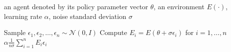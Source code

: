 \documentclass{article}
\newcommand{\jc}[1]{\comments{\textcolor{deepForestGreen}{[JC: #1]}}}
\newcommand{\rw}[1]{\comments{\textcolor{blue}{[Rui: #1]}}}
\newcommand{\comments}[1]{#1}
\begin{document}
\begin{algorithm}[htp]
\caption{ES\_STEP}
\label{alg:es_step}
\begin{algorithmic}[1]
    an agent denoted by its policy parameter vector $\theta$, an environment $E(\cdot)$,  learning rate $\alpha$, noise standard deviation $\sigma$
  
   \STATE Sample $\epsilon_{1}, \epsilon_{2}, \ldots, \epsilon_{n} \sim \mathcal{N}(0, I)$
   \STATE Compute $E_{i} = E(\theta + \sigma\epsilon_{i})$ for $i = 1, \ldots, n$
    $\alpha \frac{1}{n\sigma} \sum_{i=1}^{n} E_{i} \epsilon_{i}$%

   
\end{algorithmic}
\end{algorithm}



\end{document}
